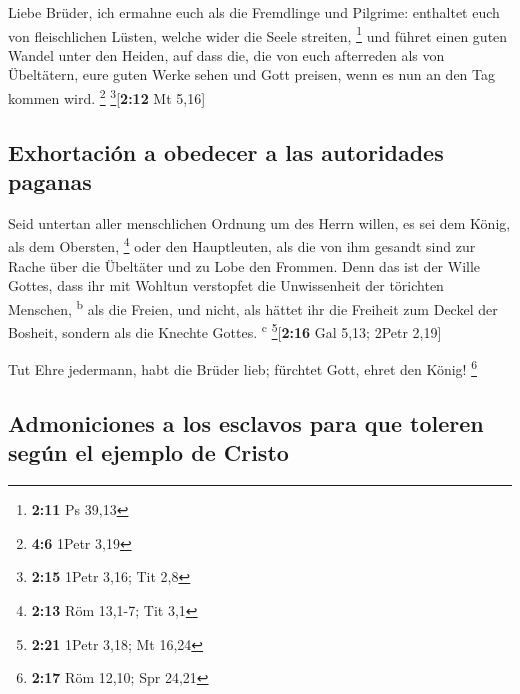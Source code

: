  Liebe Brüder, ich ermahne euch als die Fremdlinge und
Pilgrime: enthaltet euch von fleischlichen Lüsten, welche wider die
Seele streiten, \footnote{\textbf{2:11} Ps 39,13}  und
führet einen guten Wandel unter den Heiden, auf dass die, die von euch
afterreden als von Übeltätern, eure guten Werke sehen und Gott preisen,
wenn es nun an den Tag kommen wird. \footnote{\textbf{4:6} 1Petr 3,19}
\footnote{\textbf{2:15} 1Petr 3,16; Tit 2,8}{[}\textbf{2:12} Mt 5,16{]}

\hypertarget{exhortaciuxf3n-a-obedecer-a-las-autoridades-paganas}{%
\subsection{Exhortación a obedecer a las autoridades
paganas}\label{exhortaciuxf3n-a-obedecer-a-las-autoridades-paganas}}

 Seid untertan aller menschlichen Ordnung um des Herrn
willen, es sei dem König, als dem Obersten, \footnote{\textbf{2:13} Röm
  13,1-7; Tit 3,1}  oder den Hauptleuten, als die von ihm
gesandt sind zur Rache über die Übeltäter und zu Lobe den Frommen.
 Denn das ist der Wille Gottes, dass ihr mit Wohltun
verstopfet die Unwissenheit der törichten Menschen, \textsuperscript{b}
 als die Freien, und nicht, als hättet ihr die Freiheit
zum Deckel der Bosheit, sondern als die Knechte Gottes.
\textsuperscript{c} \footnote{\textbf{2:21} 1Petr 3,18; Mt 16,24}{[}\textbf{2:16}
Gal 5,13; 2Petr 2,19{]}

 Tut Ehre jedermann, habt die Brüder lieb; fürchtet Gott,
ehret den König! \footnote{\textbf{2:17} Röm 12,10; Spr 24,21}

\hypertarget{admoniciones-a-los-esclavos-para-que-toleren-seguxfan-el-ejemplo-de-cristo}{%
\subsection{Admoniciones a los esclavos para que toleren según el
ejemplo de
Cristo}\label{admoniciones-a-los-esclavos-para-que-toleren-seguxfan-el-ejemplo-de-cristo}}

